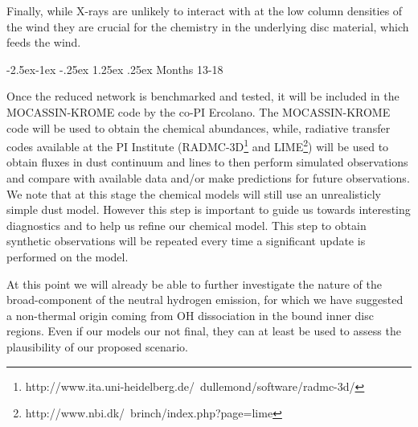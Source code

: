 \documentclass[10pt,fleqn,twoside]{article}
\makeatletter
\renewcommand\paragraph{\@startsection{paragraph}{4}{\z@}%
            {-2.5ex\@plus -1ex \@minus -.25ex}%
            {1.25ex \@plus .25ex}%
            {\normalfont\normalsize\bfseries}}
\makeatother
\begin{document}
Finally, while X-rays are unlikely to interact with at the low column densities of the wind they are crucial for the chemistry in the underlying disc material, which feeds the wind. 

\paragraph{Months 13-18}

 Once the reduced network is benchmarked and tested, it will be included in the MOCASSIN-KROME code by the co-PI Ercolano. The MOCASSIN-KROME code will be used to obtain the chemical abundances, while, radiative transfer codes available at the PI Institute (RADMC-3D\footnote{http://www.ita.uni-heidelberg.de/~dullemond/software/radmc-3d/} and LIME\footnote{http://www.nbi.dk/~brinch/index.php?page=lime}) will be used to obtain fluxes in dust continuum and lines to then perform simulated observations and compare with available data and/or make predictions for future observations. We note that at this stage the chemical models will still use an unrealisticly simple dust model. However this step is important to guide us towards interesting diagnostics and to help us refine our chemical model. This step to obtain synthetic observations will be repeated every time a significant update is performed on the model. 

At this point we will already be able to further investigate the nature of the broad-component of the neutral hydrogen emission, for which we have suggested a non-thermal origin coming from OH dissociation in the bound inner disc regions. Even if our models our not final, they can at least be used to assess the plausibility of our proposed scenario.
\end{document}
